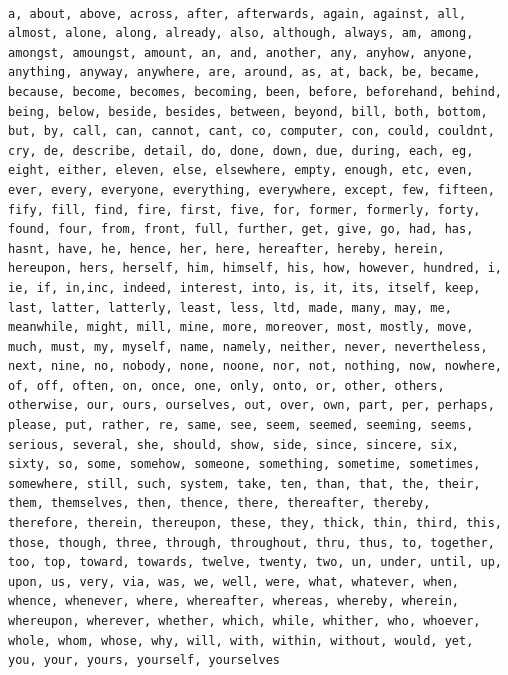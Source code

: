 \begin{verbatim}

a, about, above, across, after, afterwards, again, against, all,
almost, alone, along, already, also, although, always, am, among,
amongst, amoungst, amount, an, and, another, any, anyhow, anyone,
anything, anyway, anywhere, are, around, as, at, back, be, became,
because, become, becomes, becoming, been, before, beforehand, behind,
being, below, beside, besides, between, beyond, bill, both, bottom,
but, by, call, can, cannot, cant, co, computer, con, could, couldnt,
cry, de, describe, detail, do, done, down, due, during, each, eg,
eight, either, eleven, else, elsewhere, empty, enough, etc, even,
ever, every, everyone, everything, everywhere, except, few, fifteen,
fify, fill, find, fire, first, five, for, former, formerly, forty,
found, four, from, front, full, further, get, give, go, had, has,
hasnt, have, he, hence, her, here, hereafter, hereby, herein,
hereupon, hers, herself, him, himself, his, how, however, hundred, i,
ie, if, in,inc, indeed, interest, into, is, it, its, itself, keep,
last, latter, latterly, least, less, ltd, made, many, may, me,
meanwhile, might, mill, mine, more, moreover, most, mostly, move,
much, must, my, myself, name, namely, neither, never, nevertheless,
next, nine, no, nobody, none, noone, nor, not, nothing, now, nowhere,
of, off, often, on, once, one, only, onto, or, other, others,
otherwise, our, ours, ourselves, out, over, own, part, per, perhaps,
please, put, rather, re, same, see, seem, seemed, seeming, seems,
serious, several, she, should, show, side, since, sincere, six,
sixty, so, some, somehow, someone, something, sometime, sometimes,
somewhere, still, such, system, take, ten, than, that, the, their,
them, themselves, then, thence, there, thereafter, thereby,
therefore, therein, thereupon, these, they, thick, thin, third, this,
those, though, three, through, throughout, thru, thus, to, together,
too, top, toward, towards, twelve, twenty, two, un, under, until, up,
upon, us, very, via, was, we, well, were, what, whatever, when,
whence, whenever, where, whereafter, whereas, whereby, wherein,
whereupon, wherever, whether, which, while, whither, who, whoever,
whole, whom, whose, why, will, with, within, without, would, yet,
you, your, yours, yourself, yourselves

\end{verbatim}

\clearpage

